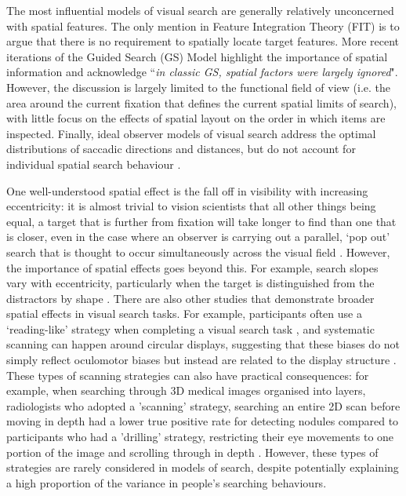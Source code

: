 \documentclass[man, floatsintext]{apa7}
\begin{document}
The most influential models of visual search are generally relatively unconcerned with spatial features. The only mention in Feature Integration Theory (FIT) \citep{treisman1980} is to argue that there is no requirement to spatially locate target features. More recent iterations of the Guided Search (GS) Model \citep{wolfe2021guided} highlight the importance of spatial information and acknowledge ``\textit{in classic GS, spatial factors were largely ignored}". However, the discussion is largely limited to the functional field of view (i.e. the area around the current fixation that defines the current spatial limits of search), with little focus on the effects of spatial layout on the order in which items are inspected. Finally, ideal observer models of visual search \citep{najemnik2008} address the optimal distributions of saccadic directions and distances, but do not account for individual spatial search behaviour \citep{morvan_maloney2012, nowakowska2017, clarke2016}.

One well-understood spatial effect is the fall off in visibility with increasing eccentricity: it is almost trivial to vision scientists that all other things being equal, a target that is further from fixation will take longer to find than one that is closer, even in the case where an observer is carrying out a parallel, `pop out' search that is thought to occur simultaneously across the visual field \citep{buetti2019predicting}. However, the importance of spatial effects goes beyond this. For example, search slopes vary with eccentricity, particularly when the target is distinguished from the distractors by shape \cite{hughes2024bayesian}. There are also other studies that demonstrate broader spatial effects in visual search tasks. For example, participants often use a `reading-like' strategy when completing a visual search task \cite{amor2016persistence}, and systematic scanning can happen around circular displays, suggesting that these biases do not simply reflect oculomotor biases but instead are related to the display structure \cite{hooge1996control}. These types of scanning strategies can also have practical consequences: for example, when searching through 3D medical images organised into layers, radiologists who adopted a 'scanning' strategy, searching an entire 2D scan before moving in depth had a lower true positive rate for detecting nodules compared to participants who had a 'drilling' strategy, restricting their eye movements to one portion of the image and scrolling through in depth \citep{drew2013scanners}. However, these types of strategies are rarely considered in models of search, despite potentially explaining a high proportion of the variance in people's searching behaviours.
\end{document}
